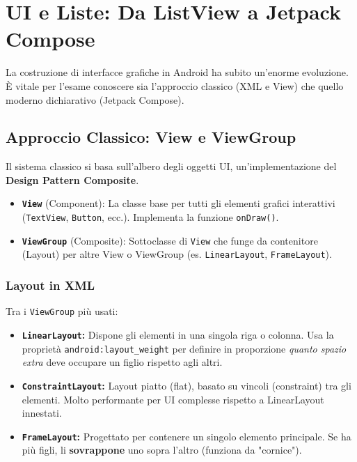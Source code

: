 
\chapter{UI e Liste: Da ListView a Jetpack Compose}

La costruzione di interfacce grafiche in Android ha subito un'enorme evoluzione.
È vitale per l'esame conoscere sia l'approccio classico (XML e View) che quello moderno dichiarativo (Jetpack Compose).

\section{Approccio Classico: View e ViewGroup}
Il sistema classico si basa sull'albero degli oggetti UI, un'implementazione del \textbf{Design Pattern Composite}.
\begin{itemize}
    \item \textbf{\texttt{View}} (Component): La classe base per tutti gli elementi grafici interattivi (\texttt{TextView}, \texttt{Button}, ecc.). Implementa la funzione \texttt{onDraw()}.
    \item \textbf{\texttt{ViewGroup}} (Composite): Sottoclasse di \texttt{View} che funge da contenitore (Layout) per altre View o ViewGroup (es. \texttt{LinearLayout}, \texttt{FrameLayout}).
\end{itemize}

\subsection{Layout in XML}
Tra i \texttt{ViewGroup} più usati:
\begin{itemize}
    \item \textbf{\texttt{LinearLayout}:} Dispone gli elementi in una singola riga o colonna.
    Usa la proprietà \texttt{android:layout\_weight} per definire in proporzione \textit{quanto spazio extra} deve occupare un figlio rispetto agli altri.
    \item \textbf{\texttt{ConstraintLayout}:} Layout piatto (flat), basato su vincoli (constraint) tra gli elementi.
    Molto performante per UI complesse rispetto a LinearLayout innestati.
    \item \textbf{\texttt{FrameLayout}:} Progettato per contenere un singolo elemento principale.
    Se ha più figli, li \textbf{sovrappone} uno sopra l'altro (funziona da "cornice").
\end{itemize}

